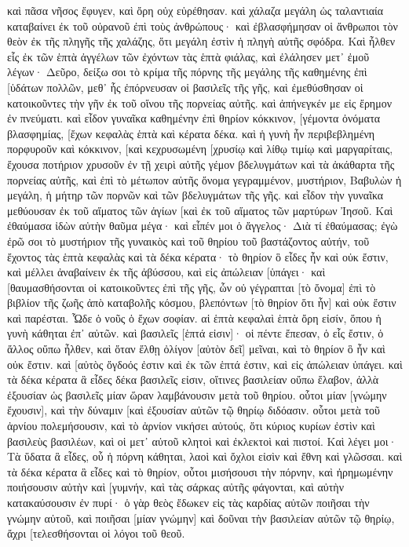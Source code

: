 καὶ πᾶσα νῆσος ἔφυγεν, καὶ ὄρη οὐχ εὑρέθησαν. 
καὶ χάλαζα μεγάλη ὡς ταλαντιαία καταβαίνει ἐκ τοῦ οὐρανοῦ ἐπὶ τοὺς ἀνθρώπους· καὶ ἐβλασφήμησαν οἱ ἄνθρωποι τὸν θεὸν ἐκ τῆς πληγῆς τῆς χαλάζης, ὅτι μεγάλη ἐστὶν ἡ πληγὴ αὐτῆς σφόδρα. 
Καὶ ἦλθεν εἷς ἐκ τῶν ἑπτὰ ἀγγέλων τῶν ἐχόντων τὰς ἑπτὰ φιάλας, καὶ ἐλάλησεν μετ᾽ ἐμοῦ λέγων· Δεῦρο, δείξω σοι τὸ κρίμα τῆς πόρνης τῆς μεγάλης τῆς καθημένης ἐπὶ [ὑδάτων πολλῶν, 
μεθ᾽ ἧς ἐπόρνευσαν οἱ βασιλεῖς τῆς γῆς, καὶ ἐμεθύσθησαν οἱ κατοικοῦντες τὴν γῆν ἐκ τοῦ οἴνου τῆς πορνείας αὐτῆς. 
καὶ ἀπήνεγκέν με εἰς ἔρημον ἐν πνεύματι. καὶ εἶδον γυναῖκα καθημένην ἐπὶ θηρίον κόκκινον, [γέμοντα ὀνόματα βλασφημίας, [ἔχων κεφαλὰς ἑπτὰ καὶ κέρατα δέκα. 
καὶ ἡ γυνὴ ἦν περιβεβλημένη πορφυροῦν καὶ κόκκινον, [καὶ κεχρυσωμένη [χρυσίῳ καὶ λίθῳ τιμίῳ καὶ μαργαρίταις, ἔχουσα ποτήριον χρυσοῦν ἐν τῇ χειρὶ αὐτῆς γέμον βδελυγμάτων καὶ τὰ ἀκάθαρτα τῆς πορνείας αὐτῆς, 
καὶ ἐπὶ τὸ μέτωπον αὐτῆς ὄνομα γεγραμμένον, μυστήριον, Βαβυλὼν ἡ μεγάλη, ἡ μήτηρ τῶν πορνῶν καὶ τῶν βδελυγμάτων τῆς γῆς. 
καὶ εἶδον τὴν γυναῖκα μεθύουσαν ἐκ τοῦ αἵματος τῶν ἁγίων [καὶ ἐκ τοῦ αἵματος τῶν μαρτύρων Ἰησοῦ. Καὶ ἐθαύμασα ἰδὼν αὐτὴν θαῦμα μέγα· 
καὶ εἶπέν μοι ὁ ἄγγελος· Διὰ τί ἐθαύμασας; ἐγὼ ἐρῶ σοι τὸ μυστήριον τῆς γυναικὸς καὶ τοῦ θηρίου τοῦ βαστάζοντος αὐτήν, τοῦ ἔχοντος τὰς ἑπτὰ κεφαλὰς καὶ τὰ δέκα κέρατα· 
τὸ θηρίον ὃ εἶδες ἦν καὶ οὐκ ἔστιν, καὶ μέλλει ἀναβαίνειν ἐκ τῆς ἀβύσσου, καὶ εἰς ἀπώλειαν [ὑπάγει· καὶ [θαυμασθήσονται οἱ κατοικοῦντες ἐπὶ τῆς γῆς, ὧν οὐ γέγραπται [τὸ ὄνομα] ἐπὶ τὸ βιβλίον τῆς ζωῆς ἀπὸ καταβολῆς κόσμου, βλεπόντων [τὸ θηρίον ὅτι ἦν] καὶ οὐκ ἔστιν καὶ παρέσται. 
Ὧδε ὁ νοῦς ὁ ἔχων σοφίαν. αἱ ἑπτὰ κεφαλαὶ ἑπτὰ ὄρη εἰσίν, ὅπου ἡ γυνὴ κάθηται ἐπ᾽ αὐτῶν. καὶ βασιλεῖς [ἑπτά εἰσιν]· 
οἱ πέντε ἔπεσαν, ὁ εἷς ἔστιν, ὁ ἄλλος οὔπω ἦλθεν, καὶ ὅταν ἔλθῃ ὀλίγον [αὐτὸν δεῖ] μεῖναι, 
καὶ τὸ θηρίον ὃ ἦν καὶ οὐκ ἔστιν. καὶ [αὐτὸς ὄγδοός ἐστιν καὶ ἐκ τῶν ἑπτά ἐστιν, καὶ εἰς ἀπώλειαν ὑπάγει. 
καὶ τὰ δέκα κέρατα ἃ εἶδες δέκα βασιλεῖς εἰσιν, οἵτινες βασιλείαν οὔπω ἔλαβον, ἀλλὰ ἐξουσίαν ὡς βασιλεῖς μίαν ὥραν λαμβάνουσιν μετὰ τοῦ θηρίου. 
οὗτοι μίαν [γνώμην ἔχουσιν], καὶ τὴν δύναμιν [καὶ ἐξουσίαν αὐτῶν τῷ θηρίῳ διδόασιν. 
οὗτοι μετὰ τοῦ ἀρνίου πολεμήσουσιν, καὶ τὸ ἀρνίον νικήσει αὐτούς, ὅτι κύριος κυρίων ἐστὶν καὶ βασιλεὺς βασιλέων, καὶ οἱ μετ᾽ αὐτοῦ κλητοὶ καὶ ἐκλεκτοὶ καὶ πιστοί. 
Καὶ λέγει μοι· Τὰ ὕδατα ἃ εἶδες, οὗ ἡ πόρνη κάθηται, λαοὶ καὶ ὄχλοι εἰσὶν καὶ ἔθνη καὶ γλῶσσαι. 
καὶ τὰ δέκα κέρατα ἃ εἶδες καὶ τὸ θηρίον, οὗτοι μισήσουσι τὴν πόρνην, καὶ ἠρημωμένην ποιήσουσιν αὐτὴν καὶ [γυμνήν, καὶ τὰς σάρκας αὐτῆς φάγονται, καὶ αὐτὴν κατακαύσουσιν ἐν πυρί· 
ὁ γὰρ θεὸς ἔδωκεν εἰς τὰς καρδίας αὐτῶν ποιῆσαι τὴν γνώμην αὐτοῦ, καὶ ποιῆσαι [μίαν γνώμην] καὶ δοῦναι τὴν βασιλείαν αὐτῶν τῷ θηρίῳ, ἄχρι [τελεσθήσονται οἱ λόγοι τοῦ θεοῦ. 
